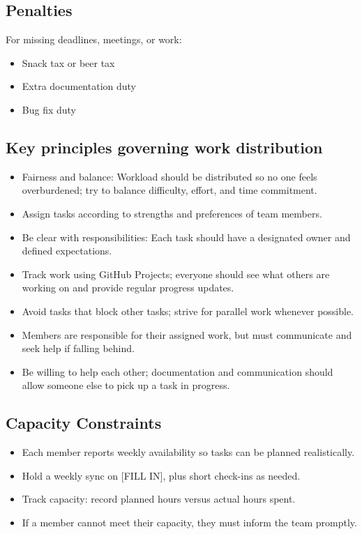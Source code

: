 \documentclass[]{VUMIFTemplateClass}
\begin{document}
\subsection*{Penalties}
For missing deadlines, meetings, or work:
\begin{itemize}
    \item Snack tax or beer tax
    \item Extra documentation duty
    \item Bug fix duty
\end{itemize}

\subsection*{Key principles governing work distribution}
\begin{itemize}
    \item Fairness and balance: Workload should be distributed so no one feels overburdened; try to balance difficulty, effort, and time commitment.
    \item Assign tasks according to strengths and preferences of team members.
    \item Be clear with responsibilities: Each task should have a designated owner and defined expectations.
    \item Track work using GitHub Projects; everyone should see what others are working on and provide regular progress updates.
    \item Avoid tasks that block other tasks; strive for parallel work whenever possible.
    \item Members are responsible for their assigned work, but must communicate and seek help if falling behind.
    \item Be willing to help each other; documentation and communication should allow someone else to pick up a task in progress.
\end{itemize}

\subsection*{Capacity Constraints}
\begin{itemize}
    \item Each member reports weekly availability so tasks can be planned realistically.
    \item Hold a weekly sync on [FILL IN], plus short check-ins as needed.
    \item Track capacity: record planned hours versus actual hours spent.
    \item If a member cannot meet their capacity, they must inform the team promptly.
\end{itemize}
\end{document}
